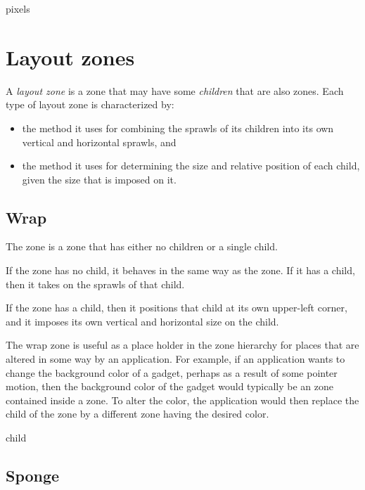 
 {pixels}

\section{Layout zones}
\label{sec-zones-layout}

A \emph{layout zone} is a zone that may have some \emph{children} that
are also zones.  Each type of layout zone is characterized by:

\begin{itemize}
\item the method it uses for combining the sprawls of its children
  into its own vertical and horizontal sprawls, and
\item the method it uses for determining the size and relative
  position of each child, given the size that is imposed on it. 
\end{itemize}

\subsection{Wrap}
\label{sec-zones-layout-wrap}

The  zone is a zone that has either no children or a single
child.  

If the  zone has no child, it behaves in the same way as
the  zone.  If it has a
child, then it takes on the sprawls of that child.

If the  zone has a child, then it positions that child at
its own upper-left corner, and it imposes its own vertical and
horizontal size on the child.

The wrap zone is useful as a place holder in the zone hierarchy for
places that are altered in some way by an application.  For example,
if an application wants to change the background color of a gadget,
perhaps as a result of some pointer motion, then the background color
of the gadget would typically be an  zone
 contained inside a 
zone.  To alter the color, the application would then replace the
child of the  zone by a different  zone having
the desired color.


 {\optional child}

\subsection{Sponge}
\label{sec-zones-layout-sponge}

